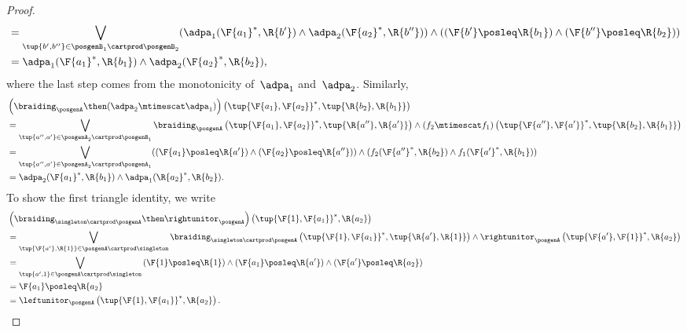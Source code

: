 \begin{proof}
\begin{equation}
\begin{aligned}
            &=\bigvee_{\tup{b',b''}\in \posgenB_1\cartprod \posgenB_2}(\adpa_1(\F{a_1}^*,\R{b'})\wedge \adpa_2(\F{a_2}^*,\R{b''}))\wedge (\left(\F{b'}\posleq \R{b_1}\right) \wedge \left(\F{b''}\posleq \R{b_2}\right))\\
            &= \adpa_1(\F{a_1}^*,\R{b_1}) \wedge \adpa_2(\F{a_2}^*,\R{b_2}),
        \end{aligned}
    \end{equation}
    where the last step comes from the monotonicity of~$\adpa_1$ and~$\adpa_2$. Similarly,
    \begin{equation}
        \begin{aligned}
            &\left( \braiding_\posgenA \then (\adpa_2\mtimescat \adpa_1)\right)\left( \tup{\F{a_1},\F{a_2}}^*,\tup{\R{b_2},\R{b_1}}\right)\\
            &=\bigvee_{\tup{a'',a'}\in \posgenA_2\cartprod \posgenB_1}\braiding_\posgenA\left(\tup{\F{a_1},\F{a_2}}^*,\tup{\R{a''},\R{a'}} \right)\wedge \left(f_2\mtimescat f_1\right) \left( \tup{\F{a''},\F{a'}}^*,\tup{\R{b_2},\R{b_1}}\right)\\
            &=\bigvee_{\tup{a'',a'}\in \posgenA_2\cartprod \posgenA_1}(\left(\F{a_1}\posleq \R{a'}\right)\wedge \left(\F{a_2}\posleq \R{a''}\right)) \wedge (f_2(\F{a''}^*,\R{b_2})\wedge f_1(\F{a'}^*,\R{b_1}))\\
            &= \adpa_2(\F{a_1}^*,\R{b_1}) \wedge \adpa_1(\R{a_2}^*,\R{b_2}).
        \end{aligned}
    \end{equation}
    To show the first triangle identity, we write
    \begin{equation}
        \begin{aligned}
            &\left(\braiding_{\singleton \cartprod \posgenA}\then \rightunitor_\posgenA\right)\left( \tup{\F{1},\F{a_1}}^*,\R{a_2}\right)\\
            &=\bigvee_{\tup{\F{a'},\R{1}}\in \posgenA\cartprod \singleton}\braiding_{\singleton \cartprod \posgenA}\left( \tup{\F{1},\F{a_1}}^*,\tup{\R{a'},\R{1}}\right)\wedge \rightunitor_\posgenA\left( \tup{\F{a'},\F{1}}^*,\R{a_2}\right)\\
            &=\bigvee_{\tup{a',1}\in \posgenA\cartprod \singleton} \left(\F{1}\posleq \R{1}\right) \wedge \left(\F{a_1}\posleq \R{a'}\right)\wedge \left(\F{a'}\posleq \R{a_2}\right)\\
            &=\F{a_1}\posleq \R{a_2}\\
            &=\leftunitor_\posgenA\left( \tup{\F{1},\F{a_1}}^*,\R{a_2}\right).

\end{aligned}
\end{equation}
\end{proof}
